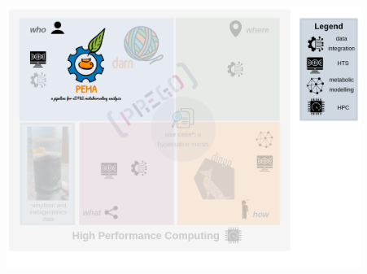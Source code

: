 \documentclass{beamer}
\begin{document}
   \begin{frame}
      \includegraphics[width=115mm]{resources/phd_graphical_abstract-pema.png}
   \end{frame}
\end{document}

